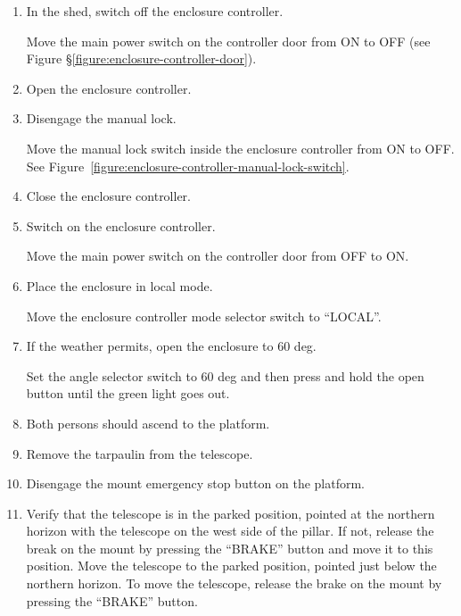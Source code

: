 \begin{enumerate}

\item
In the shed, switch off the enclosure controller.

Move the main power switch on the controller door from ON to OFF (see Figure \S\ref{figure:enclosure-controller-door}).

\item
Open the enclosure controller.

\item
Disengage the manual lock.

Move the manual lock switch inside the enclosure controller from ON to OFF. See Figure~\ref{figure:enclosure-controller-manual-lock-switch}.

\item
Close the enclosure controller.

\item
Switch on the enclosure controller.

Move the main power switch on the controller door from OFF to ON.

\item
Place the enclosure in local mode.

Move the enclosure controller mode selector switch to “LOCAL”.

\item
If the weather permits, open the enclosure to 60 deg.

Set the angle selector switch to 60 deg and then press and hold the open button until the green light goes out.

\item
Both persons should ascend to the platform.

\item
Remove the tarpaulin from the telescope.

\item Disengage the mount emergency stop button on the platform.

\item
\ifcoatlioan
Verify that the telescope is in the parked position, pointed at the northern horizon with the telescope on the west side of the pillar. If not, release the break on the mount by pressing the “BRAKE” button and move it to this position.
\fi
\ifddotioan
Move the telescope to the parked position, pointed just below the northern horizon. To move the telescope, release the brake on the mount by pressing the “BRAKE” button.
\fi


\end{enumerate}
